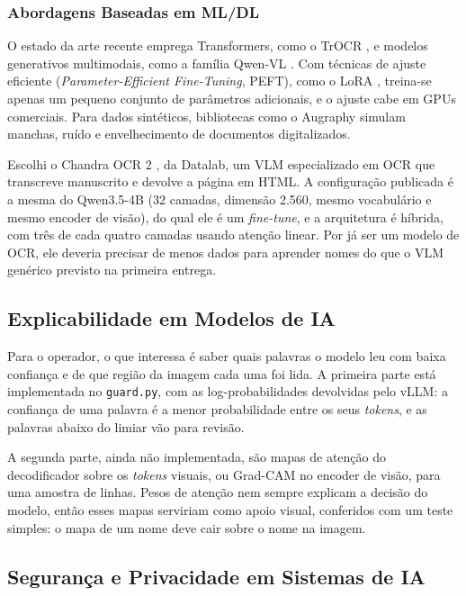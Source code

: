 \documentclass[12pt,a4paper]{article}
\begin{document}
\subsubsection{Abordagens Baseadas em ML/DL}
O estado da arte recente emprega Transformers, como o TrOCR \cite{trocr2021}, e modelos generativos multimodais, como a família Qwen-VL \cite{qwen2vl}. Com técnicas de ajuste eficiente (\emph{Parameter-Efficient Fine-Tuning}, PEFT), como o LoRA \cite{lora2022, peft2022}, treina-se apenas um pequeno conjunto de parâmetros adicionais, e o ajuste cabe em GPUs comerciais. Para dados sintéticos, bibliotecas como o Augraphy \cite{augraphy2022} simulam manchas, ruído e envelhecimento de documentos digitalizados.

Escolhi o Chandra OCR 2 \cite{chandra2026}, da Datalab, um VLM especializado em OCR que transcreve manuscrito e devolve a página em HTML. A configuração publicada é a mesma do Qwen3.5-4B \cite{qwen35} (32 camadas, dimensão 2.560, mesmo vocabulário e mesmo encoder de visão), do qual ele é um \emph{fine-tune}, e a arquitetura é híbrida, com três de cada quatro camadas usando atenção linear. Por já ser um modelo de OCR, ele deveria precisar de menos dados para aprender nomes do que o VLM genérico previsto na primeira entrega.

\subsection{Explicabilidade em Modelos de IA}

Para o operador, o que interessa é saber quais palavras o modelo leu com baixa confiança e de que região da imagem cada uma foi lida. A primeira parte está implementada no \texttt{guard.py}, com as log-probabilidades devolvidas pelo vLLM: a confiança de uma palavra é a menor probabilidade entre os seus \emph{tokens}, e as palavras abaixo do limiar vão para revisão.

A segunda parte, ainda não implementada, são mapas de atenção do decodificador sobre os \emph{tokens} visuais, ou Grad-CAM \cite{gradcam2017} no encoder de visão, para uma amostra de linhas. Pesos de atenção nem sempre explicam a decisão do modelo, então esses mapas serviriam como apoio visual, conferidos com um teste simples: o mapa de um nome deve cair sobre o nome na imagem.

\subsection{Segurança e Privacidade em Sistemas de IA}
\end{document}
